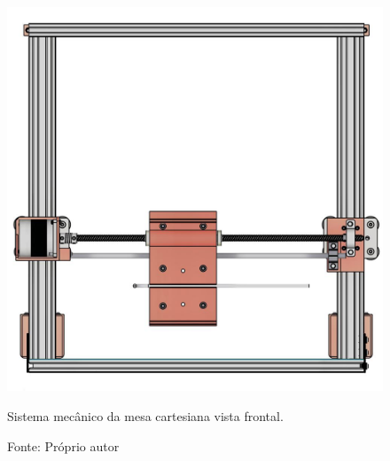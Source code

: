 \label{ap:mesacartesianafrontal}

\begin{figure}[H]
\centering
\includegraphics[scale = 0.35]{figuras/mesacartesianafrontal}
\caption{Sistema mecânico da mesa cartesiana vista frontal.}
\caption*{Fonte: Próprio autor}
\label{fig:mesacartesianafrontal}
\end{figure}

\label{ap:mesacartesianalateral}

